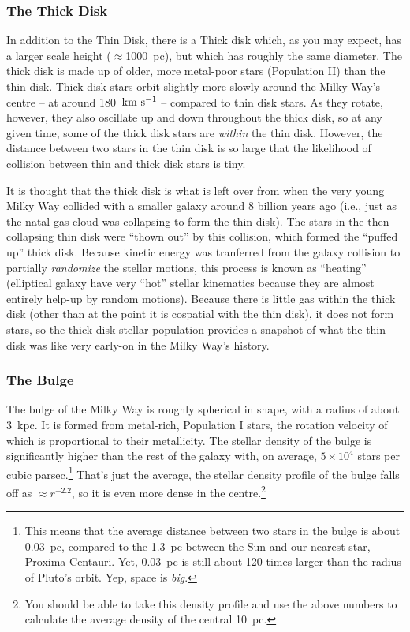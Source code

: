 \documentclass[11pt]{article}
\begin{document}
\subsubsection{The Thick Disk}
In addition to the Thin Disk, there is a Thick disk which, as you may
expect, has a larger scale height ($\approx$1000~pc), but which has
roughly the same diameter. The thick disk is made up of older, more
metal-poor stars (Population {\sc II}) than the thin disk. Thick disk
stars orbit slightly more slowly around the Milky Way's centre -- at
around 180~${\rm km~s^{-1}}$ -- compared to thin disk stars. As they
rotate, however, they also oscillate up and down throughout the thick
disk, so at any given time, some of the thick disk stars are {\it
within} the thin  disk. However, the distance between two stars in the
thin disk is so large that the likelihood of collision between thin
and thick disk stars is tiny.

It is thought that the thick disk is what is left over from when the
very young Milky Way collided with a smaller galaxy around 8 billion
years ago (i.e., just as the natal gas cloud was collapsing to form
the thin disk). The stars in the then collapsing thin disk were
``thown out'' by this collision, which formed the ``puffed up'' thick
disk. Because kinetic energy was tranferred from the galaxy collision
to partially {\it randomize} the stellar motions, this process is
known as ``heating'' (elliptical galaxy have very ``hot'' stellar
kinematics because they are almost entirely help-up by random
motions). Because there is little gas within the thick disk (other
than at the point it is cospatial with the thin disk), it does not
form stars, so the thick disk stellar population provides a snapshot
of what the thin disk was like very early-on in the Milky Way's history.

\subsubsection{The Bulge}
The bulge of the Milky Way is roughly spherical in shape, with a
radius of about 3~kpc. It is formed from metal-rich, Population {\sc
  I} stars, the rotation velocity of which is proportional to their
metallicity. The stellar density of the bulge is significantly higher
than the rest of the galaxy with, on average, $5\times10^4$ stars per
cubic parsec.\footnote{This means that the average distance between
  two stars in the bulge is about 0.03~pc, compared to the 1.3~pc
  between the Sun and our nearest star, Proxima Centauri. Yet, 0.03~pc
  is still about 120 times larger than the radius of Pluto's
  orbit. Yep, space is {\it big}.} That's just the average, the
stellar density profile of the bulge falls off as $\approx
r^{-2.2}$, so it is even more dense in the centre.\footnote{You should
be able to take this density profile and use the above numbers to
calculate the average density of the central 10~pc.}
\end{document}
